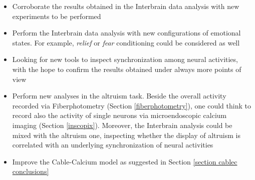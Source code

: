 \documentclass[12pt, a4paper]{report}
\begin{document}
\begin{itemize}
	\item Corroborate the results obtained in the Interbrain data analysis with new experiments to be performed
	
	\item Perform the Interbrain data analysis with new configurations of emotional states. For example, \textit{relief} or \textit{fear} conditioning could be considered as well
	
	
	\item Looking for new tools to inspect synchronization among neural activities, with the hope to confirm the results obtained under always more points of view
	
	\item Perform new analyses in the altruism task. Beside the overall activity recorded via Fiberphotometry (Section \ref{fiberphotometry}), one could think to record also the activity of single neurons via microendoscopic calcium imaging (Section \ref{inscopix}). Moreover, the Interbrain analysis could be mixed with the altruism one, inspecting whether the display of altruism is correlated with an underlying synchronization of neural activities
	
	\item Improve the Cable-Calcium model as suggested in Section \ref{section cablec conclusions}
\end{itemize}
\end{document}
